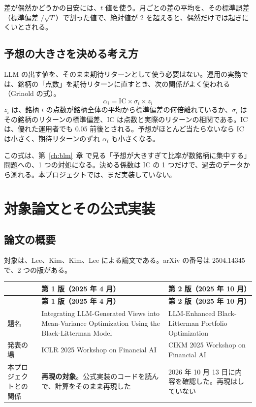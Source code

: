 \documentclass[xelatex,ja=standard,jafont=hiragino-pron,a4paper,10pt]{bxjsreport}
\newcommand{\chapref}[1]{第~\ref{#1}~章}
\begin{document}
差が偶然かどうかの目安には、$t$ 値を使う。月ごとの差の平均を、その標準誤差（標準偏差 $/\sqrt{T}$）で割った値で、絶対値が 2 を超えると、偶然だけでは起きにくいとされる。

\section{予想の大きさを決める考え方}

LLM の出す値を、そのまま期待リターンとして使う必要はない。運用の実務では、銘柄の「点数」を期待リターンに直すとき、次の関係がよく使われる（Grinold の式）。
\begin{equation}
\alpha_i = \mathrm{IC} \times \sigma_i \times z_i
\label{eq:grinold}
\end{equation}
$z_i$ は、銘柄 $i$ の点数が銘柄全体の平均から標準偏差の何倍離れているか、$\sigma_i$ はその銘柄のリターンの標準偏差、IC は点数と実際のリターンの相関である。IC は、優れた運用者でも 0.05 前後とされる。予想がほとんど当たらないなら IC は小さく、期待リターンのずれ $\alpha_i$ も小さくなる。

この式は、\chapref{ch:blm} で見る「予想が大きすぎて比率が数銘柄に集中する」問題への、1 つの対処になる。決める係数は IC の 1 つだけで、過去のデータから測れる。本プロジェクトでは、まだ実装していない。

\chapter{対象論文とその公式実装}\label{ch:paper}

\section{論文の概要}

対象は、Lee、Kim、Kim、Lee による論文である。arXiv の番号は 2504.14345 で、2 つの版がある。

\begin{longtable}{p{2.60cm}p{5.90cm}p{5.90cm}}
\toprule
 & \textbf{第 1 版（2025 年 4 月）} & \textbf{第 2 版（2025 年 10 月）} \\
\midrule
\endfirsthead
\toprule
 & \textbf{第 1 版（2025 年 4 月）} & \textbf{第 2 版（2025 年 10 月）} \\
\midrule
\endhead
\bottomrule
\endfoot
題名 & Integrating LLM-Generated Views into Mean-Variance Optimization Using the Black-Litterman Model & LLM-Enhanced Black-Litterman Portfolio Optimization \\
発表の場 & ICLR 2025 Workshop on Financial AI & CIKM 2025 Workshop on Financial AI \\
本プロジェクトとの関係 & \textbf{再現の対象}。公式実装のコードを読んで、計算をそのまま再現した & 2026 年 10 月 13 日に内容を確認した。再現はしていない \\
\end{longtable}
\end{document}
